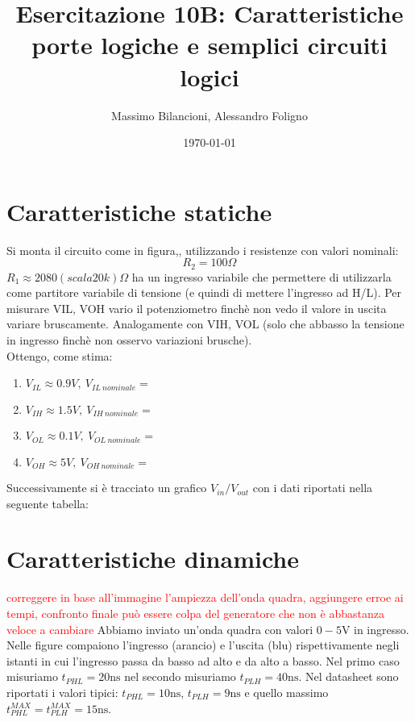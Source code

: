 \documentclass[10pt,a4paper]{article}
\date{\today}
\title{Esercitazione 10B: Caratteristiche porte logiche e semplici circuiti logici}
\author{Massimo Bilancioni, Alessandro Foligno}
\begin{document}
	
\maketitle
	
	\section{Caratteristiche statiche}
	Si monta il circuito come in figura,, utilizzando i resistenze con valori nominali:\[R_2=100\Omega \]
	$R_1\approx2080(scala 20k)\Omega$ ha un ingresso variabile che permettere di utilizzarla come partitore variabile di tensione (e quindi di mettere l'ingresso ad H/L).
	Per misurare VIL, VOH vario il potenziometro finchè non vedo il valore in uscita variare bruscamente. Analogamente con VIH, VOL (solo che abbasso la tensione in ingresso finchè non osservo variazioni brusche).
	\\Ottengo, come stima:
	\begin{enumerate}
		\item $V_{IL}\approx0.9 V,~V_{IL~nominale}=$
		\item $V_{IH}		\approx 1.5V,~V_{IH~nominale}=$
		\item $V_{OL}\approx0.1V,~V_{OL~nominale}=$
		\item $V_{OH}\approx5V,~V_{OH~nominale}=$
	\end{enumerate}
	Successivamente si è tracciato un grafico $V_{in}/V_{out}$ con i dati riportati nella seguente tabella:
	\section{Caratteristiche dinamiche}
\textcolor{red}{correggere in base all'immagine l'ampiezza dell'onda quadra, aggiungere erroe ai tempi, confronto finale può essere colpa del generatore che non è abbastanza veloce a cambiare}
Abbiamo inviato un'onda quadra con valori  $0-5 \si{\volt}$ in ingresso. Nelle figure compaiono l'ingresso (arancio) e l'uscita (blu) rispettivamente negli istanti in cui l'ingresso passa da basso ad alto e da alto a basso.
Nel primo caso misuriamo $t_{PHL}= 20 \si{\nano\second}$ nel secondo  misuriamo $t_{PLH} = 40\si{\nano \second}$.
Nel datasheet sono riportati i valori tipici: $t_{PHL}= 10 \si{\nano\second}$, $t_{PLH} = 9\si{\nano \second}$ e quello massimo $t_{PHL}^{MAX}= t_{PLH}^{MAX}= 15 \si{\nano\second}$.
\end{document}
